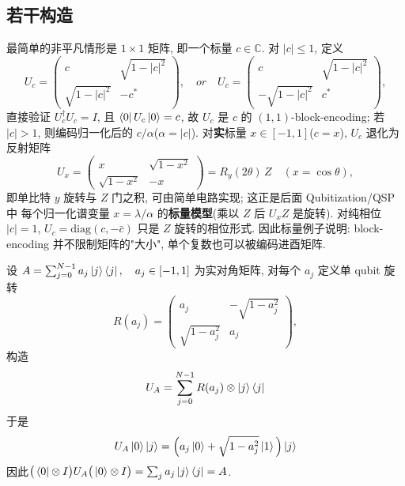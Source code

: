 \documentclass[utf8]{article} %
\numberwithin{equation}{section}   %
\newtheorem{Eg}{\hskip 2em {\color{black} 例}}[subsection]
\begin{document}
\subsection{若干构造}

\begin{Eg}
    最简单的非平凡情形是 $1\times1$ 矩阵, 即一个标量 $c \in \mathbb{C}$. 对 $|c| \le 1$, 定义
    \begin{equation}
        U_c = \begin{pmatrix} c & \sqrt{1-|c|^2} \\ \sqrt{1-|c|^2} & -c^* \end{pmatrix},\quad or 
        \quad U_c = \begin{pmatrix} c & \sqrt{1-|c|^2} \\ -\sqrt{1-|c|^2} & c^* \end{pmatrix},
    \end{equation}
    直接验证 $U_c^\dagger U_c = I$, 且 $\bra{0}U_c\ket{0} = c$, 故 $U_c$ 是 $c$ 的
    $(1,1)$-block-encoding; 若 $|c| > 1$, 则编码归一化后的 $c/\alpha$($\alpha = |c|$).
    对\textbf{实}标量 $x \in [-1,1]$($c = x$), $U_c$ 退化为反射矩阵
    \begin{equation}
        U_x = \begin{pmatrix} x & \sqrt{1-x^2} \\ \sqrt{1-x^2} & -x \end{pmatrix}
        = R_y(2\theta)\, Z \quad (x = \cos\theta),
    \end{equation}
    即单比特 $y$ 旋转与 $Z$ 门之积, 可由简单电路实现; 这正是后面 Qubitization/QSP 中
    每个归一化谱变量 $x = \lambda/\alpha$ 的\textbf{标量模型}(乘以 $Z$ 后 $U_x Z$ 是旋转).
    对纯相位 $|c| = 1$, $U_c = \mathrm{diag}(c, -\bar{c})$ 只是 $Z$ 旋转的相位形式.
    因此标量例子说明: block-encoding 并不限制矩阵的"大小", 单个复数也可以被编码进酉矩阵.
\end{Eg}

\begin{Eg}[实对角矩阵]
    设 $A=\sum_{j=0}^{N-1} a_j \ket{j}\bra{j}, \quad a_j\in[-1,1]$ 为实对角矩阵, 对每个 $a_j$ 定义单 qubit 旋转
    \begin{equation*}
        R(a_j)=\begin{pmatrix} a_j & -\sqrt{1-a_j^2} \\ \sqrt{1-a_j^2} & a_j \end{pmatrix},
    \end{equation*}
    构造
    \begin{equation*}
        U_A=\sum_{j=0}^{N-1}R(a_j)\otimes \ket{j}\bra{j}
    \end{equation*}
    于是
    \begin{equation*}
        U_A\ket{0}\ket{j}=\Big(a_j\ket{0}+\sqrt{1-a_j^2}\ket{1}\Big)\ket{j}
    \end{equation*}
    因此$\big(\bra{0}\otimes I\big)U_A\big(\ket{0}\otimes I\big)=\sum_{j}a_j\ket{j}\bra{j}=A$.
\end{Eg}
\end{document}
